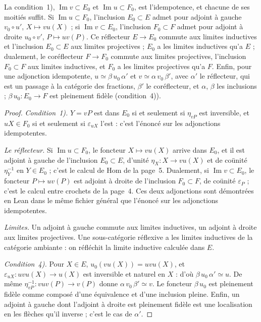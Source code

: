 \begin{enonce}
La condition~1), $\operatorname{Im} v \subset E_0$ et $\operatorname{Im} u \subset F_0$, est l'idempotence, et chacune de ses moitiés suffit. Si $\operatorname{Im} u \subset F_0$, l'inclusion $E_0 \subset E$ admet pour adjoint à gauche $v_0 \circ u'$, $X \mapsto vu(X)$ ; si $\operatorname{Im} v \subset E_0$, l'inclusion $F_0 \subset F$ admet pour adjoint à droite $u_0 \circ v'$, $P \mapsto uv(P)$. Ce réflecteur $E \to E_0$ commute aux limites inductives et l'inclusion $E_0 \subset E$ aux limites projectives ; $E_0$ a les limites inductives qu'a $E$ ; dualement, le coréflecteur $F \to F_0$ commute aux limites projectives, l'inclusion $F_0 \subset F$ aux limites inductives, et $F_0$ a les limites projectives qu'a $F$. Enfin, pour une adjonction idempotente, $u \simeq \beta\, u_0\, \alpha'$ et $v \simeq \alpha\, v_0\, \beta'$, avec $\alpha'$ le réflecteur, qui est un passage à la catégorie des fractions, $\beta' $ le coréflecteur, et $\alpha$, $\beta$ les inclusions ; $\beta\, u_0 : E_0 \to F$ est pleinement fidèle (condition~4)).
\end{enonce}

\begin{proof}
\emph{Condition~1).} $Y = vP$ est dans $E_0$ si et seulement si $\eta_{vP}$ est inversible, et $uX \in F_0$ si et seulement si $\varepsilon_{uX}$ l'est : c'est l'énoncé sur les adjonctions idempotentes.

\emph{Le réflecteur.} Si $\operatorname{Im} u \subset F_0$, le foncteur $X \mapsto vu(X)$ arrive dans $E_0$, et il est adjoint à gauche de l'inclusion $E_0 \subset E$, d'unité $\eta_X : X \to vu(X)$ et de coünité $\eta_Y^{-1}$ en $Y \in E_0$ ; c'est le calcul de Hom de la page~5. Dualement, si $\operatorname{Im} v \subset E_0$, le foncteur $P \mapsto uv(P)$ est adjoint à droite de l'inclusion $F_0 \subset F$, de coünité $\varepsilon_P$ ; c'est le calcul entre crochets de la page~4. Ces deux adjonctions sont démontrées en Lean dans le même fichier général que l'énoncé sur les adjonctions idempotentes.

\emph{Limites.} Un adjoint à gauche commute aux limites inductives, un adjoint à droite aux limites projectives. Une sous-catégorie réflexive a les limites inductives de la catégorie ambiante : on réfléchit la limite inductive calculée dans $E$.

\emph{Condition~4).} Pour $X \in E$, $u_0(vu(X)) = uvu(X)$, et $\varepsilon_{uX} : uvu(X) \to u(X)$ est inversible et naturel en $X$ : d'où $\beta\,u_0\,\alpha' \simeq u$. De même $\eta_{vP}^{-1} : vuv(P) \to v(P)$ donne $\alpha\,v_0\,\beta' \simeq v$. Le foncteur $\beta\,u_0$ est pleinement fidèle comme composé d'une équivalence et d'une inclusion pleine. Enfin, un adjoint à gauche dont l'adjoint à droite est pleinement fidèle est une localisation en les flèches qu'il inverse ; c'est le cas de $\alpha'$.
\end{proof}

